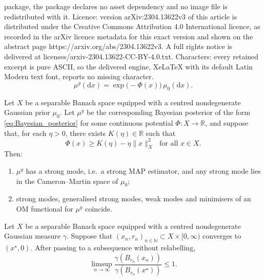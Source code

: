 \documentclass[10pt,a4paper]{amsart}
\newcommand*{\Naturals}{\mathbb{N}}
\newcommand*{\Reals}{\mathbb{R}}
\newcommand*{\cball}[2]{B_{#2}(#1)}
\newcommand*{\crcdfm}[3]{#1(\cball{#2}{#3})}
\newcommand*{\rd}{\mathrm{d}}
\renewcommand*{\geq}{\geqslant}
\renewcommand*{\leq}{\leqslant}
\begin{document}
package, the package declares no asset dependency and no image file is redistributed with it. Licence: version arXiv:2304.13622v3 of this article is distributed under the Creative Commons Attribution 4.0 International licence, as recorded in the arXiv licence metadata for this exact version and shown on the abstract page https://arxiv.org/abs/2304.13622v3. A full rights notice is delivered at licenses/arxiv-2304.13622-CC-BY-4.0.txt. Characters: every retained excerpt is pure ASCII, so the delivered engine, XeLaTeX with its default Latin Modern text font, reports no missing character.
\begin{equation}
	\label{eq:Bayesian_posterior}
	\mu^y(\rd x) = \exp\bigl(-\Phi(x)\bigr) \,\mu_0(\rd x).
\end{equation}

\begin{theorem}
	\label{thm:main}
	Let $X$ be a separable Banach space equipped with a centred nondegenerate Gaussian prior $\mu_0$.
	Let $\mu^y$ be the corresponding Bayesian posterior of the form \eqref{eq:Bayesian_posterior} for some continuous potential $\Phi \colon X \to \Reals$, and suppose that, for each $\eta > 0$, there exists $K(\eta) \in \Reals$ such that
	\begin{equation} \label{eq:Phi_lower_bound}
		\Phi(x) \geq K(\eta) - \eta\|x\|_X^{2} \text{~~for all $x \in X$.}
	\end{equation}
	Then:
	\begin{enumerate}[label=(\alph*)]
		\item $\mu^y$ has a strong mode, i.e.\ a strong MAP estimator, and any strong mode lies in the Cameron--Martin space of $\mu_0$;
		\item strong modes, generalised strong modes, weak modes and minimisers of an OM functional for $\mu^y$ coincide.
	\end{enumerate}
\end{theorem}

\begin{corollary}
	\label{cor:Gaussian_measure_limits}
	Let $X$ be a separable Banach space equipped with a centred nondegenerate Gaussian measure $\gamma$.
	Suppose that $(x_{n}, r_{n})_{n \in \Naturals} \subset X \times [0, \infty)$ converges to $(x^{\star}, 0)$.
	After passing to a subsequence without relabelling,
	\begin{equation*}
		\limsup_{n \to \infty} \frac{\crcdfm{\gamma}{x_{n}}{r_{n}}}{\crcdfm{\gamma}{x^{\star}}{r_{n}}} \leq 1.
	\end{equation*}
\end{corollary}
\end{document}
